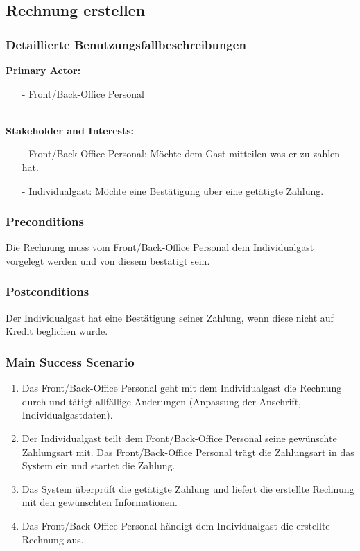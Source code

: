 \documentclass[./detailed_overview_usecases.tex]{subfiles}
\begin{document}
    \subsection{Rechnung erstellen}
    \subsubsection{Detaillierte Benutzungsfallbeschreibungen}
    \textbf{Primary Actor: }
    \begin{itemize}
        \item [-] Front/Back-Office Personal
    \end{itemize}
    \\
    \textbf{Stakeholder and Interests:}
    \begin{itemize}
        \item[-] Front/Back-Office Personal: Möchte dem Gast mitteilen was er zu zahlen hat.
        \item[-] Individualgast: Möchte eine Bestätigung über eine getätigte Zahlung.
    \end{itemize}

    \subsubsection*{Preconditions}
	Die Rechnung muss vom Front/Back-Office Personal dem Individualgast vorgelegt werden und von diesem bestätigt sein.

    \subsubsection*{Postconditions}
    Der Individualgast hat eine Bestätigung seiner Zahlung, wenn diese nicht auf Kredit beglichen wurde.

    \subsubsection*{Main Success Scenario}
    \begin{enumerate}
        \item Das Front/Back-Office Personal geht mit dem Individualgast die Rechnung durch und tätigt allfällige Änderungen (Anpassung der Anschrift, Individualgastdaten).
		\item Der Individualgast teilt dem Front/Back-Office Personal seine gewünschte Zahlungsart mit. Das Front/Back-Office Personal trägt die Zahlungsart in das System ein und startet die Zahlung.
        \item Das System überprüft die getätigte Zahlung und liefert die erstellte Rechnung mit den gewünschten Informationen.
        \item Das Front/Back-Office Personal händigt dem Individualgast die erstellte Rechnung aus.
    \end{enumerate}
\end{document}
